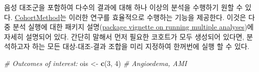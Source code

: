 \documentclass[10.5pt]{book}
\newenvironment{Shaded}{\begin{snugshade}}{\end{snugshade}}
\newcommand{\KeywordTok}[1]{\textcolor[rgb]{0.13,0.29,0.53}{\textbf{#1}}}
\newcommand{\DecValTok}[1]{\textcolor[rgb]{0.00,0.00,0.81}{#1}}
\newcommand{\StringTok}[1]{\textcolor[rgb]{0.31,0.60,0.02}{#1}}
\newcommand{\CommentTok}[1]{\textcolor[rgb]{0.56,0.35,0.01}{\textit{#1}}}
\newcommand{\NormalTok}[1]{#1}
\theoremstyle{definition}
\theoremstyle{definition}
\theoremstyle{definition}
\theoremstyle{remark}
\begin{document}
음성 대조군을 포함하여 다수의 결과에 대해 하나 이상의 분석을 수행하기
원할 수 있다.
\href{https://ohdsi.github.io/CohortMethod/}{CohortMethod}는 이러한
연구를 효율적으로 수행하는 기능을 제공한다. 이것은 다중 분석 실행에 대한
패키지
설명(\href{https://ohdsi.github.io/CohortMethod/articles/MultipleAnalyses.html}{package
vignette on running multiple analyses})에 자세히 설명되어 있다. 간단히
말해서 먼저 필요한 코호트가 모두 생성되어 있다면, 분석하고자 하는 모든
대상-대조-결과 조합을 미리 지정하여 한꺼번에 실행 할 수 있다.

\begin{Shaded}
\begin{Highlighting}[]
\CommentTok{# Outcomes of interest:}
\NormalTok{ois <-}\StringTok{ }\KeywordTok{c}\NormalTok{(}\DecValTok{3}\NormalTok{, }\DecValTok{4}\NormalTok{) }\CommentTok{# Angioedema, AMI}


\end{Highlighting}
\end{Shaded}
\end{document}
